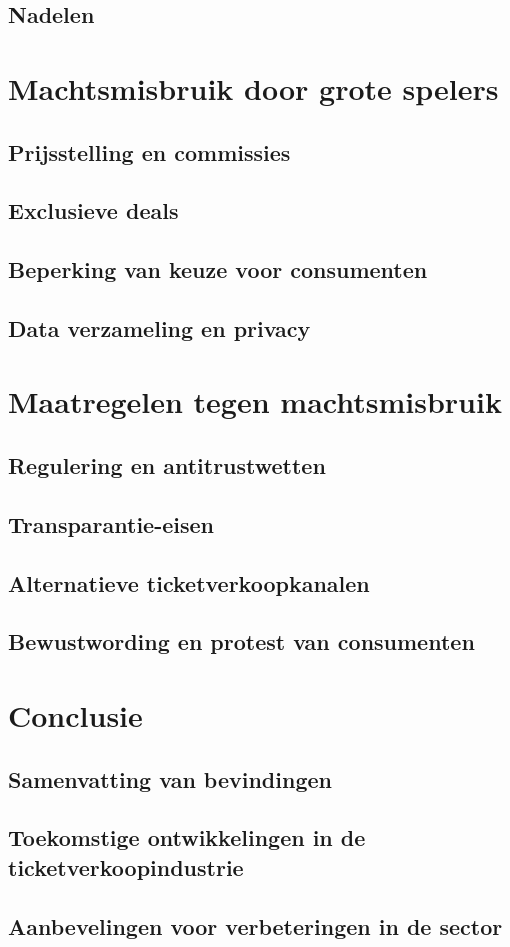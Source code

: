 \documentclass[a4paper, 12pt]{article}
\begin{document}
\subsection{Nadelen}

\section{Machtsmisbruik door grote spelers}
\subsection{Prijsstelling en commissies}
\subsection{Exclusieve deals}
\subsection{Beperking van keuze voor consumenten}
\subsection{Data verzameling en privacy}

\section{Maatregelen tegen machtsmisbruik}
\subsection{Regulering en antitrustwetten}
\subsection{Transparantie-eisen}
\subsection{Alternatieve ticketverkoopkanalen}
\subsection{Bewustwording en protest van consumenten}

\section{Conclusie}
\subsection{Samenvatting van bevindingen}
\subsection{Toekomstige ontwikkelingen in de ticketverkoopindustrie}
\subsection{Aanbevelingen voor verbeteringen in de sector}

% 



\end{document}
